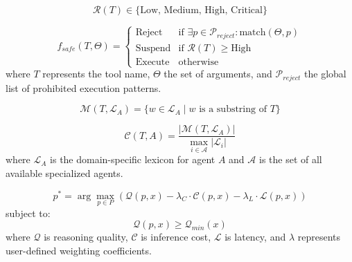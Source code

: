 
\begin{equation} \label{eq:risk_level}
\mathcal{R}(T) \in \{ \text{Low, Medium, High, Critical} \}
\end{equation}

\begin{equation} \label{eq:safety_gate}
f_{safe}(T, \Theta) = 
\begin{cases} 
\text{Reject} & \text{if } \exists p \in \mathcal{P}_{reject} : \text{match}(\Theta, p) \\
\text{Suspend} & \text{if } \mathcal{R}(T) \geq \text{High} \\
\text{Execute} & \text{otherwise}
\end{cases}
\end{equation}
where $T$ represents the tool name, $\Theta$ the set of arguments, and $\mathcal{P}_{reject}$ the global list of prohibited execution patterns.


\begin{equation} \label{eq:lexicon_match}
\mathcal{M}(T, \mathcal{L}_A) = \{ w \in \mathcal{L}_A \mid w \text{ is a substring of } T \}
\end{equation}

\begin{equation} \label{eq:routing_confidence}
\mathcal{C}(T, A) = \frac{|\mathcal{M}(T, \mathcal{L}_A)|}{\max_{i \in \mathcal{A}} |\mathcal{L}_i|}
\end{equation}
where $\mathcal{L}_A$ is the domain-specific lexicon for agent $A$ and $\mathcal{A}$ is the set of all available specialized agents.


\begin{equation} \label{eq:routing_opt}
p^* = \arg \max_{p \in P} \left( \mathcal{Q}(p, x) - \lambda_C \cdot \mathcal{C}(p, x) - \lambda_L \cdot \mathcal{L}(p, x) \right)
\end{equation}
subject to:
\begin{equation*}
\mathcal{Q}(p, x) \geq \mathcal{Q}_{min}(x)
\end{equation*}
where $\mathcal{Q}$ is reasoning quality, $\mathcal{C}$ is inference cost, $\mathcal{L}$ is latency, and $\lambda$ represents user-defined weighting coefficients.

